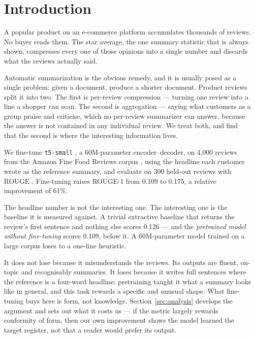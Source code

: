 \section{Introduction}
\label{sec:intro}

A popular product on an e-commerce platform accumulates thousands of reviews.
No buyer reads them. The star average, the one summary statistic that is
always shown, compresses every one of those opinions into a single number and
discards what the reviews actually said.

Automatic summarization is the obvious remedy, and it is usually posed as a
single problem: given a document, produce a shorter document. Product reviews
split it into two. The first is per-review compression --- turning one review
into a line a shopper can scan. The second is aggregation --- saying what
customers as a group praise and criticise, which no per-review summarizer can
answer, because the answer is not contained in any individual review. We treat
both, and find that the second is where the interesting information lives.

We fine-tune \texttt{t5-small} \cite{raffel2020t5}, a 60M-parameter
encoder--decoder, on 4{,}000 reviews from the Amazon Fine Food Reviews corpus
\cite{mcauley2013amazon}, using the headline each customer wrote as the
reference summary, and evaluate on 300 held-out reviews with ROUGE
\cite{lin2004rouge}. Fine-tuning raises ROUGE-1 from 0.109 to 0.175, a relative
improvement of 61\%.

The headline number is not the interesting one. The interesting one is the
baseline it is measured against. A trivial extractive baseline that returns the
review's first sentence and nothing else scores 0.126 --- and the
\emph{pretrained model without fine-tuning} scores 0.109, below it. A
60M-parameter model trained on a large corpus loses to a one-line heuristic.

It does not lose because it misunderstands the reviews. Its outputs are fluent,
on-topic and recognisably summaries. It loses because it writes full sentences
where the reference is a four-word headline: pretraining taught it what a
summary looks like in general, and this task rewards a specific and unusual
shape. What fine-tuning buys here is form, not knowledge.
Section~\ref{sec:analysis} develops the argument and sets out what it costs us
--- if the metric largely rewards conformity of form, then our own improvement
shows the model learned the target register, not that a reader would prefer its
output.

